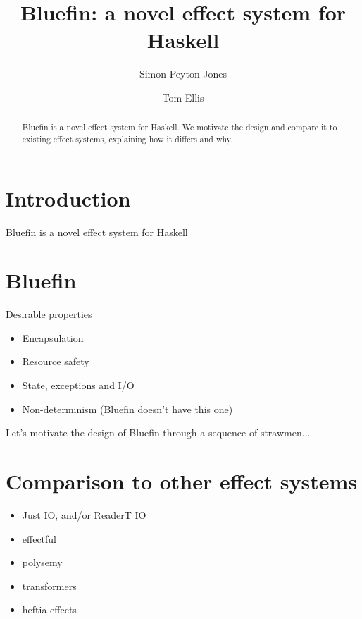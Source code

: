 \documentclass[sigplan,screen]{acmart}
\begin{document}
\title{Bluefin: a novel effect system for Haskell}

\author{Simon Peyton Jones}

\author{Tom Ellis}

\begin{abstract}
  Bluefin is a novel effect system for Haskell.  We motivate the
  design and compare it to existing effect systems, explaining how it
  differs and why.
\end{abstract}

\maketitle

\section{Introduction}

Bluefin is a novel effect system for Haskell

\section{Bluefin}

Desirable properties

\begin{itemize}
\item Encapsulation
\item Resource safety
\item State, exceptions and I/O
\item Non-determinism (Bluefin doesn't have this one)
\end{itemize}

Let's motivate the design of Bluefin through a sequence of strawmen...

\section{Comparison to other effect systems}

\begin{itemize}
\item Just IO, and/or ReaderT IO
\item effectful
\item polysemy
\item transformers
\item heftia-effects
\end{itemize}
\end{document}
